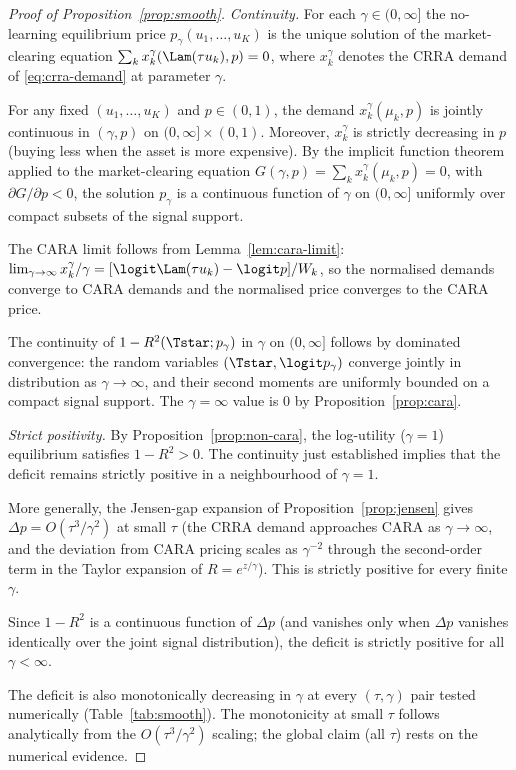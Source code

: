 \begin{proof}[Proof of Proposition~\ref{prop:smooth}]
\emph{Continuity.} For each $\gamma\in(0,\infty]$ the no-learning
equilibrium price $p_{\gamma}(u_{1},\ldots,u_{K})$ is the unique solution
of the market-clearing equation
$\sum_{k}x_{k}^{\gamma}(\Lam(\tau u_{k}),p)=0$, where $x_{k}^{\gamma}$
denotes the CRRA demand of \eqref{eq:crra-demand} at parameter $\gamma$.

For any fixed $(u_{1},\ldots,u_{K})$ and $p\in(0,1)$, the demand
$x_{k}^{\gamma}(\mu_{k},p)$ is jointly continuous in $(\gamma,p)$ on
$(0,\infty]\times(0,1)$. Moreover, $x_{k}^{\gamma}$ is strictly
decreasing in $p$ (buying less when the asset is more expensive). By the
implicit function theorem applied to the market-clearing equation
$G(\gamma,p)=\sum_{k}x_{k}^{\gamma}(\mu_{k},p)=0$, with
$\partial G/\partial p<0$, the solution $p_{\gamma}$ is a continuous
function of $\gamma$ on $(0,\infty]$ uniformly over compact subsets of
the signal support.

The CARA limit follows from Lemma~\ref{lem:cara-limit}:
$\lim_{\gamma\to\infty}x_{k}^{\gamma}/\gamma
=[\logit\Lam(\tau u_{k})-\logit p]/W_{k}$, so the normalised demands
converge to CARA demands and the normalised price converges to the CARA
price.

The continuity of $1-R^{2}(\Tstar;p_{\gamma})$ in $\gamma$ on
$(0,\infty]$ follows by dominated convergence: the random variables
$(\Tstar, \logit p_{\gamma})$ converge jointly in distribution as
$\gamma\to\infty$, and their second moments are uniformly bounded on a
compact signal support. The $\gamma=\infty$ value is $0$ by
Proposition~\ref{prop:cara}.

\emph{Strict positivity.} By Proposition~\ref{prop:non-cara}, the
log-utility ($\gamma=1$) equilibrium satisfies $1-R^{2}>0$. The
continuity just established implies that the deficit remains strictly
positive in a neighbourhood of $\gamma=1$.

More generally, the Jensen-gap expansion of
Proposition~\ref{prop:jensen} gives
$\Delta p=O(\tau^{3}/\gamma^{2})$ at small $\tau$ (the CRRA demand
approaches CARA as $\gamma\to\infty$, and the deviation from CARA
pricing scales as $\gamma^{-2}$ through the second-order term in the
Taylor expansion of $R=e^{z/\gamma}$). This is strictly positive for
every finite $\gamma$.

Since $1-R^{2}$ is a continuous function of $\Delta p$ (and vanishes
only when $\Delta p$ vanishes identically over the joint signal
distribution), the deficit is strictly positive for all
$\gamma<\infty$.

The deficit is also monotonically decreasing in $\gamma$ at every
$(\tau,\gamma)$ pair tested numerically (Table~\ref{tab:smooth}).
The monotonicity at small $\tau$ follows analytically from the
$O(\tau^{3}/\gamma^{2})$ scaling; the global claim (all $\tau$) rests on
the numerical evidence.
\end{proof}

